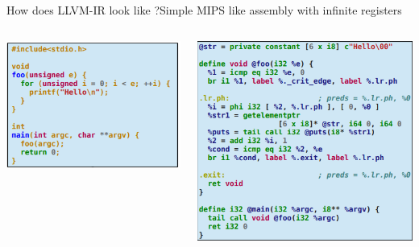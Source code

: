 \documentclass{beamer}
\begin{document}
\begin{frame}{How does LLVM-IR look like ?}{Simple MIPS like assembly with infinite registers}
\begin{columns}

\begin{column}{0.5\textwidth}
\includegraphics[scale=0.2,width=\textwidth]{code}

\end{column}

\begin{column}{0.5\textwidth}
\includegraphics[scale=0.2, width=\textwidth]{ir}

\end{column}
\end{columns}
  
\end{frame}
\end{document}
